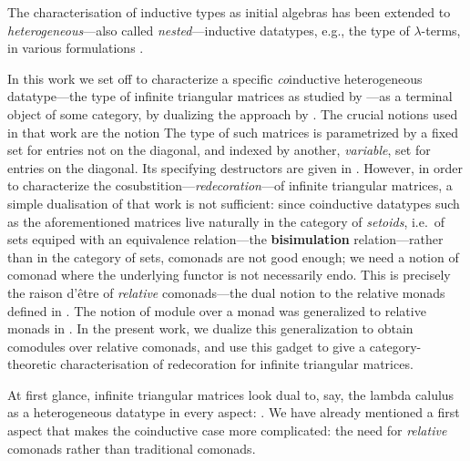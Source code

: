 \documentclass{amsart}
\newcommand{\fat}[1]{\textbf{#1}}
\begin{document}
 The characterisation of inductive types as initial algebras 
 has been extended to \emph{heterogeneous}---also called \emph{nested}---inductive datatypes, e.g., the type of $\lambda$-terms,
 in various formulations \parencite{fpt, DBLP:journals/iandc/HirschowitzM10}.
 
 

 In this work we set off to characterize a specific \emph{co}inductive heterogeneous datatype---the type of 
 infinite triangular matrices as studied by \textcite{DBLP:conf/types/MatthesP11}---as a terminal object of some 
 category, by dualizing the approach by \textcite{DBLP:journals/iandc/HirschowitzM10}.
 The crucial notions used in that work are the notion
 The type of such matrices is parametrized by a fixed set for entries not on the diagonal, and indexed by another, \emph{variable}, set for entries on 
 the diagonal. Its specifying destructors are given in .
 However, in order to characterize the cosubstition---\emph{redecoration}---of infinite triangular matrices, 
 a simple dualisation of that work is not sufficient: since coinductive datatypes such as the aforementioned matrices 
 live naturally in the category of 
 \emph{setoids}, i.e.\ of sets equiped with an equivalence relation---the \fat{bisimulation} relation---rather than in the category of sets,
 comonads are not good enough; we need a notion of comonad where the underlying functor is not necessarily endo.
 This is precisely the raison d'\^etre of \emph{relative} comonads---the dual notion to the relative monads defined in 
  \parencite{DBLP:conf/fossacs/AltenkirchCU10}. 
 The notion of module over a monad was generalized to relative monads in \parencite{ahrens_relmonads}.
 In the present work, we dualize this generalization to obtain comodules over relative comonads, and use this gadget to 
 give a category-theoretic characterisation of redecoration for infinite triangular matrices.
 
 At first glance, infinite triangular matrices look dual to, say, the lambda calulus as a heterogeneous datatype \parencite{DBLP:journals/iandc/HirschowitzM10}
 in every aspect: 
 . We have already mentioned a first aspect that makes the coinductive case more complicated: the need for 
 \emph{relative} comonads rather than traditional comonads.
 
\end{document}
